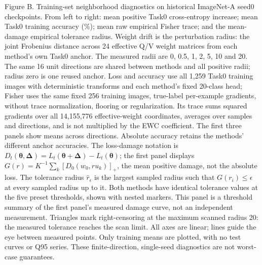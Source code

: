 \caption{Figure B. Training-set neighborhood diagnostics on historical ImageNet-A seed0 checkpoints. From left to right: mean positive Task0 cross-entropy increase; mean Task0 training accuracy (\%); mean raw empirical Fisher trace; and the mean-damage empirical tolerance radius. Weight drift is the perturbation radius: the joint Frobenius distance across 24 effective Q/V weight matrices from each method's own Task0 anchor. The measured radii are 0, 0.5, 1, 2, 5, 10 and 20. The same 16 unit directions are shared between methods and all positive radii; radius zero is one reused anchor. Loss and accuracy use all 1,259 Task0 training images with deterministic transforms and each method's fixed 20-class head; Fisher uses the same fixed 256 training images, true-label per-example gradients, without trace normalization, flooring or regularization. Its trace sums squared gradients over all 14,155,776 effective-weight coordinates, averages over samples and directions, and is not multiplied by the EWC coefficient. The first three panels show means across directions. Absolute accuracy retains the methods' different anchor accuracies. The loss-damage notation is $D_t(\boldsymbol{\theta},\boldsymbol{\Delta})=L_t(\boldsymbol{\theta}+\boldsymbol{\Delta})-L_t(\boldsymbol{\theta})$; the first panel displays $G(r)=K^{-1}\sum_k[D_0(w_0,ru_k)]_+$, the mean positive damage, not the absolute loss. The tolerance radius $\hat r_\epsilon$ is the largest sampled radius such that $G(r_i)\leq\epsilon$ at every sampled radius up to it. Both methods have identical tolerance values at the five preset thresholds, shown with nested markers. This panel is a threshold summary of the first panel's measured damage curve, not an independent measurement. Triangles mark right-censoring at the maximum scanned radius 20: the measured tolerance reaches the scan limit. All axes are linear; lines guide the eye between measured points. Only training means are plotted, with no test curves or Q95 series. These finite-direction, single-seed diagnostics are not worst-case guarantees.}
